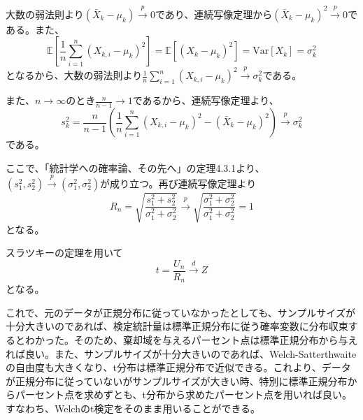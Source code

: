 大数の弱法則より$(\bar{X}_{k} - \mu_{k}) \xrightarrow{p} 0$であり、連続写像定理から$(\bar{X}_{k} - \mu_{k})^{2} \xrightarrow{p} 0$である。また、
\begin{equation}
    \mathbb{E}\left[\frac{1}{n} \sum_{i = 1}^{n} (X_{k, i} - \mu_{k})^{2}\right] = \mathbb{E}[(X_{k} - \mu_{k})^{2}] = \text{Var}[X_{k}] = \sigma_{k}^{2}
\end{equation}
となるから、大数の弱法則より$\frac{1}{n} \sum_{i = 1}^{n} (X_{k, i} - \mu_{k})^{2} \xrightarrow{p} \sigma_{k}^{2}$である。

また、$n \to \infty$のとき$\frac{n}{n - 1} \to 1$であるから、連続写像定理より、
\begin{equation}
    s_{k}^{2} = \frac{n}{n - 1} \left(\frac{1}{n} \sum_{i = 1}^{n} (X_{k, i} - \mu_{k})^{2} - (\bar{X}_{k} - \mu_{k})^{2}\right) \xrightarrow{p} \sigma_{k}^{2}
\end{equation}
である。

ここで、「統計学への確率論、その先へ」の定理4.3.1より、$(s_{1}^{2}, s_{2}^{2}) \xrightarrow{p} (\sigma_{1}^{2}, \sigma_{2}^{2})$が成り立つ。再び連続写像定理より
\begin{equation}
    R_{n} = \sqrt{\frac{s_{1}^{2} + s_{2}^{2}}{\sigma_{1}^{2} + \sigma_{2}^{2}}} \xrightarrow{p} \sqrt{\frac{\sigma_{1}^{2} + \sigma_{2}^{2}}{\sigma_{1}^{2} + \sigma_{2}^{2}}} = 1
\end{equation}
となる。

スラツキーの定理を用いて
\begin{equation}
    t = \frac{U_{n}}{R_{n}} \xrightarrow{d} Z
\end{equation}
となる。

これで、元のデータが正規分布に従っていなかったとしても、サンプルサイズが十分大きいのであれば、検定統計量は標準正規分布に従う確率変数に分布収束するとわかった。そのため、棄却域を与えるパーセント点は標準正規分布から与えれば良い。また、サンプルサイズが十分大きいのであれば、Welch-Satterthwaiteの自由度も大きくなり、t分布は標準正規分布で近似できる。これより、データが正規分布に従っていないがサンプルサイズが大きい時、特別に標準正規分布からパーセント点を求めずとも、t分布から求めたパーセント点を用いれば良い。すなわち、Welchのt検定をそのまま用いることができる。
